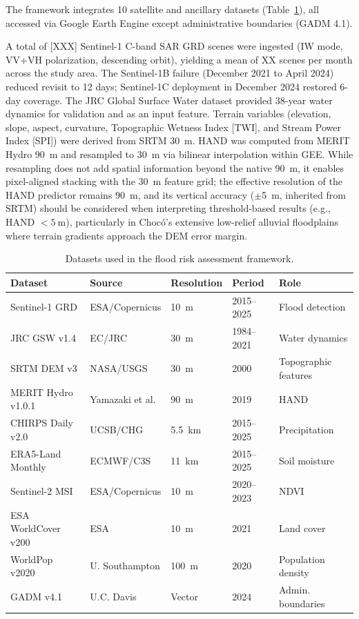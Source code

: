 \documentclass{article}
\begin{document}
The framework integrates 10 satellite and ancillary datasets (Table~\ref{tab:data_sources}), all accessed via Google Earth Engine except administrative boundaries (GADM 4.1).

A total of [XXX] Sentinel-1 C-band SAR GRD scenes were ingested (IW mode, VV+VH polarization, descending orbit), yielding a mean of XX scenes per month across the study area. The Sentinel-1B failure (December 2021 to April 2024) reduced revisit to 12 days; Sentinel-1C deployment in December 2024 restored 6-day coverage. The JRC Global Surface Water dataset \citep{Pekel2016} provided 38-year water dynamics for validation and as an input feature. Terrain variables (elevation, slope, aspect, curvature, Topographic Wetness Index [TWI], and Stream Power Index [SPI]) were derived from SRTM \SI{30}{\metre}. HAND was computed from MERIT Hydro \SI{90}{\metre} \citep{Yamazaki2019} and resampled to \SI{30}{\metre} via bilinear interpolation within GEE. While resampling does not add spatial information beyond the native \SI{90}{\metre}, it enables pixel-aligned stacking with the \SI{30}{\metre} feature grid; the effective resolution of the HAND predictor remains \SI{90}{\metre}, and its vertical accuracy ($\pm$\SI{5}{\metre}, inherited from SRTM) should be considered when interpreting threshold-based results (e.g., HAND $< \SI{5}{\metre}$), particularly in Choc\'o's extensive low-relief alluvial floodplains where terrain gradients approach the DEM error margin.

\begin{table}[htbp]
\caption{Datasets used in the flood risk assessment framework.}
\label{tab:data_sources}
\centering
\footnotesize
\begin{tabular}{lllll}
\toprule
\textbf{Dataset} & \textbf{Source} & \textbf{Resolution} & \textbf{Period} & \textbf{Role} \\
\midrule
Sentinel-1 GRD & ESA/Copernicus & \SI{10}{\metre} & 2015--2025 & Flood detection \\
JRC GSW v1.4 & EC/JRC & \SI{30}{\metre} & 1984--2021 & Water dynamics \\
SRTM DEM v3 & NASA/USGS & \SI{30}{\metre} & 2000 & Topographic features \\
MERIT Hydro v1.0.1 & Yamazaki et al. & \SI{90}{\metre} & 2019 & HAND \\
CHIRPS Daily v2.0 & UCSB/CHG & \SI{5.5}{\kilo\metre} & 2015--2025 & Precipitation \\
ERA5-Land Monthly & ECMWF/C3S & \SI{11}{\kilo\metre} & 2015--2025 & Soil moisture \\
Sentinel-2 MSI & ESA/Copernicus & \SI{10}{\metre} & 2020--2023 & NDVI \\
ESA WorldCover v200 & ESA & \SI{10}{\metre} & 2021 & Land cover \\
WorldPop v2020 & U. Southampton & \SI{100}{\metre} & 2020 & Population density \\
GADM v4.1 & U.C. Davis & Vector & 2024 & Admin. boundaries \\
\bottomrule
\end{tabular}
\end{table}
\end{document}
